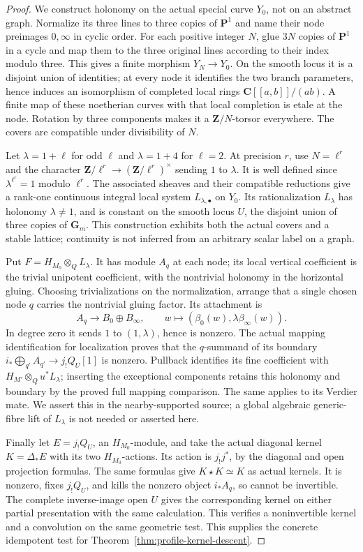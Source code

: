 \documentclass[11pt]{article}
\theoremstyle{definition}
\theoremstyle{remark}
\begin{document}
\begin{proof}
We construct holonomy on the actual special curve $Y_0$, not on
an abstract graph.  Normalize its three lines to three copies of
$\mathbf P^1$ and name their node preimages $0,\infty$ in cyclic
order.  For each positive integer $N$, glue $3N$ copies of
$\mathbf P^1$ in a cycle and map them to the three original lines
according to their index modulo three.  This gives a finite
morphism $Y_N\to Y_0$.  On the smooth locus it is a disjoint union
of identities; at every node it identifies the two branch parameters,
hence induces an isomorphism of completed local rings
$\mathbf C[[a,b]]/(ab)$.  A finite map of these noetherian curves
with that local completion is etale at the node.  Rotation by three
components makes it a $\mathbf Z/N$-torsor everywhere.
The covers are compatible under divisibility of $N$.

Let $\lambda=1+\ell$ for odd $\ell$ and $\lambda=1+4$ for $\ell=2$.
At precision $r$, use $N=\ell^r$ and the character
$\mathbf Z/\ell^r\to(\mathbf Z/\ell^r)^\times$ sending $1$ to
$\lambda$.  It is well defined since $\lambda^{\ell^r}=1$
modulo $\ell^r$.  The associated sheaves and their compatible
reductions give a rank-one continuous integral local system
$L_{\lambda,\bullet}$ on $Y_0$.  Its rationalization $L_\lambda$
has holonomy $\lambda\ne1$, and is constant on the smooth locus
$U$, the disjoint union of three copies of $\mathbf G_m$.  This construction
exhibits both the actual covers and a stable lattice; continuity
is not inferred from an arbitrary scalar label on a graph.

Put $F=H_{M_0}\otimes_Q L_\lambda$.  It has module $A_q$ at each node;
its local vertical coefficient is the trivial unipotent coefficient,
with the nontrivial holonomy in the horizontal gluing.  Choosing
trivializations on the normalization, arrange that a single chosen
node $q$ carries the nontrivial gluing factor.  Its attachment is
\[
 A_q\longrightarrow B_0\oplus B_\infty,\qquad
 w\longmapsto(\beta_0(w),\lambda\beta_\infty(w)).
\]
In degree zero it sends $1$ to $(1,\lambda)$, hence is nonzero.
The actual mapping identification for localization proves that the
$q$-summand of its boundary $i_*\bigoplus_{q'}A_{q'}\to j_!Q_U[1]$
is nonzero.  Pullback identifies its
fine coefficient with $H_{M'}\otimes_Q u^*L_\lambda$; inserting the
exceptional components retains this holonomy and boundary by the
proved full mapping comparison.  The same applies to its Verdier mate.
We assert this in the nearby-supported source; a global algebraic
generic-fibre lift of $L_\lambda$ is not needed or asserted here.

Finally let $E=j_!Q_U$, an $H_{M_0}$-module, and take the actual
diagonal kernel $K=\Delta_*E$ with its two $H_{M_0}$-actions.
Its action is $j_!j^*$, by the diagonal and open projection formulas.
The same formulas give $K\star K\simeq K$ as actual kernels.
It is nonzero, fixes $j_!Q_U$, and kills the nonzero object $i_*A_q$,
so cannot be invertible.  The complete inverse-image open $U$ gives
the corresponding kernel on either partial presentation with the
same calculation.  This verifies a noninvertible kernel and a
convolution on the same geometric test.  This supplies the concrete idempotent test for
Theorem~\ref{thm:profile-kernel-descent}.
\end{proof}
\end{document}
